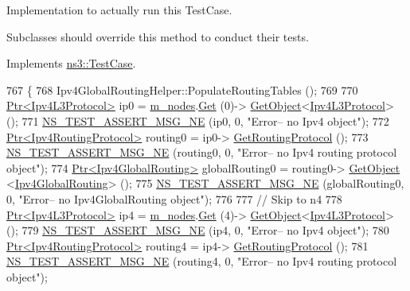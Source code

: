 Implementation to actually run this Test\+Case. 

Subclasses should override this method to conduct their tests. 

Implements \hyperlink{classns3_1_1TestCase_a8ff74680cf017ed42011e4be51917a24}{ns3\+::\+Test\+Case}.


\begin{DoxyCode}
767 \{
768   Ipv4GlobalRoutingHelper::PopulateRoutingTables ();
769 
770   \hyperlink{classns3_1_1Ptr}{Ptr<Ipv4L3Protocol>} ip0 = \hyperlink{classTwoBridgeTest_af72518a9099a0db24ee51af9bc783c01}{m\_nodes}.\hyperlink{classns3_1_1NodeContainer_a9ed96e2ecc22e0f5a3d4842eb9bf90bf}{Get} (0)->
      \hyperlink{classns3_1_1Object_a13e18c00017096c8381eb651d5bd0783}{GetObject}<\hyperlink{classns3_1_1Ipv4L3Protocol}{Ipv4L3Protocol}> ();
771   \hyperlink{group__testing_ga73d66fb0050a5111453fd144e767b91a}{NS\_TEST\_ASSERT\_MSG\_NE} (ip0, 0, \textcolor{stringliteral}{"Error-- no Ipv4 object"});  
772   \hyperlink{classns3_1_1Ptr}{Ptr<Ipv4RoutingProtocol>} routing0 = ip0->
      \hyperlink{classns3_1_1Ipv4L3Protocol_aa1e4efbf4978299e47406895c3f4b41d}{GetRoutingProtocol} ();
773   \hyperlink{group__testing_ga73d66fb0050a5111453fd144e767b91a}{NS\_TEST\_ASSERT\_MSG\_NE} (routing0, 0, \textcolor{stringliteral}{"Error-- no Ipv4 routing protocol object"});  
774   \hyperlink{classns3_1_1Ptr}{Ptr<Ipv4GlobalRouting>} globalRouting0 = routing0->
      \hyperlink{classns3_1_1Object_a13e18c00017096c8381eb651d5bd0783}{GetObject} <\hyperlink{classns3_1_1Ipv4GlobalRouting}{Ipv4GlobalRouting}> ();
775   \hyperlink{group__testing_ga73d66fb0050a5111453fd144e767b91a}{NS\_TEST\_ASSERT\_MSG\_NE} (globalRouting0, 0, \textcolor{stringliteral}{"Error-- no Ipv4GlobalRouting object"});  
776 
777   \textcolor{comment}{// Skip to n4}
778   \hyperlink{classns3_1_1Ptr}{Ptr<Ipv4L3Protocol>} ip4 = \hyperlink{classTwoBridgeTest_af72518a9099a0db24ee51af9bc783c01}{m\_nodes}.\hyperlink{classns3_1_1NodeContainer_a9ed96e2ecc22e0f5a3d4842eb9bf90bf}{Get} (4)->
      \hyperlink{classns3_1_1Object_a13e18c00017096c8381eb651d5bd0783}{GetObject}<\hyperlink{classns3_1_1Ipv4L3Protocol}{Ipv4L3Protocol}> ();
779   \hyperlink{group__testing_ga73d66fb0050a5111453fd144e767b91a}{NS\_TEST\_ASSERT\_MSG\_NE} (ip4, 0, \textcolor{stringliteral}{"Error-- no Ipv4 object"});  
780   \hyperlink{classns3_1_1Ptr}{Ptr<Ipv4RoutingProtocol>} routing4 = ip4->
      \hyperlink{classns3_1_1Ipv4L3Protocol_aa1e4efbf4978299e47406895c3f4b41d}{GetRoutingProtocol} ();
781   \hyperlink{group__testing_ga73d66fb0050a5111453fd144e767b91a}{NS\_TEST\_ASSERT\_MSG\_NE} (routing4, 0, \textcolor{stringliteral}{"Error-- no Ipv4 routing protocol object"});  

\end{DoxyCode}
